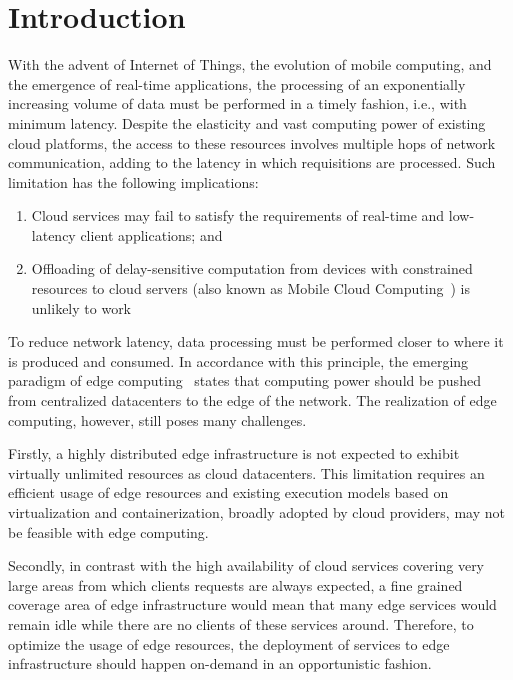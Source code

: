 \section{Introduction}

With the advent of Internet of Things, the evolution of mobile computing, and the emergence of real-time applications, the processing of an exponentially increasing volume of data must be performed in a timely fashion, i.e., with minimum latency. Despite the elasticity and vast computing power of existing cloud platforms, the access to these resources involves multiple hops of network communication, adding to the latency in which requisitions are processed. Such limitation has the following implications:

\begin{enumerate}

\item Cloud services may fail to satisfy the requirements of real-time and low-latency client applications; and

\item Offloading of delay-sensitive computation from devices with constrained resources to cloud servers (also known as Mobile Cloud Computing~\cite{}) is unlikely to work

\end{enumerate}

To reduce network latency, data processing must be performed closer to where it is produced and consumed. In accordance with this principle, the emerging paradigm of edge computing~\cite{} states that computing power should be pushed from centralized datacenters to the edge of the network. The realization of edge computing, however, still poses many challenges. 

%
Firstly, a highly distributed edge infrastructure is not expected to exhibit virtually unlimited resources as cloud datacenters. This limitation requires an efficient usage of edge resources and existing execution models based on virtualization and containerization, broadly adopted by cloud providers, may not be feasible with edge computing.

Secondly, in contrast with the high availability of cloud services covering very large areas from which clients requests are always expected, a fine grained coverage area of edge infrastructure would mean that many edge services would remain idle while there are no clients of these services around. Therefore, to optimize the usage of edge resources, the deployment of services to edge infrastructure should happen on-demand in an opportunistic fashion. 

